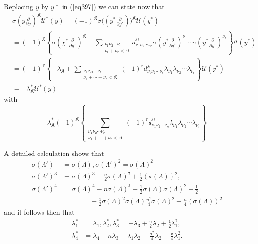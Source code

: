 Replacing $y$ by $y*$ in (\ref{eq397}) we can state now that 
{\fontsize{10pt}{12pt}\selectfont
\begin{align*}
& \sigma(y \frac{\partial}{\partial y})^\mathfrak{K} \mathcal{U}^* (y)
  = (-1)^\mathfrak{K} \sigma \big ( (y^* \frac{\partial}{\partial y^*})
  \big)^\mathfrak{K} \mathcal{U} (y^*)\\ 
& = (-1)^\mathfrak{K} \left \{ \sigma (\chi^* \frac{\partial}{\partial
    y^*})^\mathfrak{K}+ \sum_{\substack {\nu_1 \nu_2 \cdots \nu_r
      \\ \nu_1 + \nu_r < \mathfrak{K}}}d^\mathfrak{K}_{\nu_1 \nu_2
    \cdots \nu_r} \sigma (y^* \frac{\partial}{\partial y^*} )^{\nu_1}
  \cdots \sigma(y^* \frac{\partial}{\partial y^*})^{\nu_r} \right \}
  \mathcal{U} (y^*)\\ 
& = (-1)^\mathfrak{K} \left\{ - \lambda_{\mathfrak{K}} + \sum_{\substack
    {\nu_1 \nu_21 \cdots \nu_r \\ \nu_1 + \cdots + \nu_r <
      \mathfrak{K}}} (-1)^r d^\mathfrak{K}_{\nu_1 \nu_2 \cdots \nu_r}
  \lambda_{\nu_1} \lambda_{\nu_2} \cdots \lambda_{\nu_r} \right\}
  \mathcal{U} (y^*)\\ 
& = - \lambda^*_\mathfrak{K} \mathcal{U}^* (y) 
\end{align*}}\relax
with
\begin{equation*}
\lambda^*_\mathfrak{K} (-1)^\mathfrak{K} \left\{ \sum_{\substack{\nu_1
    \nu_2 \cdots \nu_r \\ \nu_1 + \cdots + \nu_r < \mathfrak{K}}}
(-1)^r d^\mathfrak{K}_{\nu_1 \nu_2 \cdots \nu_n } \lambda_{\nu_1}
\lambda_{\nu_2} \cdots \lambda_{\nu_r} \right\} \tag{398}\label{eq398} 
\end{equation*}

A detailed calculation shows that 
\begin{align*}
\sigma (\Lambda') & = \sigma (\Lambda), \sigma (\Lambda')^2 = \sigma
(\Lambda)^2\\ 
\sigma (\Lambda')^3 & = \sigma (\Lambda)^3 - \frac{n}{2} \sigma
(\Lambda)^2 + \frac{1}{2} (\sigma (\Lambda))^2,\\ 
\sigma (\Lambda')^4 & = \sigma (\Lambda)^4 - n \sigma (\Lambda)^3 +
\frac{1}{2} \sigma (\Lambda) \sigma (\Lambda)^2 + \frac{1}{2} \\
& \qquad \qquad + \frac{1}{2} \sigma (\Lambda)^2 \sigma (\Lambda) \frac
     {n^2}{4} \sigma (\Lambda)^2 - \frac{n}{4} (\sigma
     (\Lambda))^2  
\end{align*}\pageoriginale 
and it follows then that 
\begin{align*}
\lambda^*_1 & = \lambda_1, \lambda^*_2, \lambda^*_3 = - \lambda_3 +
\frac{n}{2} \lambda_2 + \frac{1}{2} \lambda^2_1,\\ 
\lambda^*_4 & = \lambda_4 - n \lambda_3 - \lambda_1 \lambda_2 +
\frac{n^2}{4} \lambda_2 + \frac{n}{4} \lambda^2_1. 
\end{align*}

